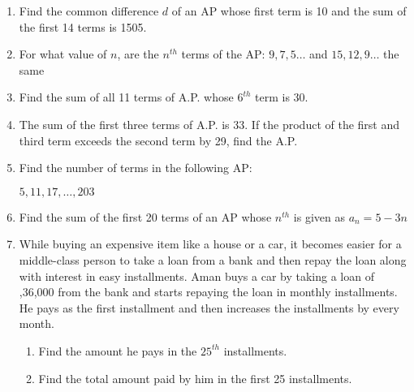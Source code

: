 \documentclass{article}
\begin{document}
\begin{enumerate}
    \item Find the common difference $d$ of an AP whose first term is 10 and the sum of the first 14 terms is 1505.
    \item For what value of $n$, are the $n^{th}$ terms of the AP: $9,7,5\dots$ and $15,12,9\dots$ the same

    \item Find the sum of all 11 terms of A.P. whose $6^{th}$ term is 30.
    \item The sum of the first three terms of A.P. is 33. If the product of the first and third term exceeds the second term by 29, find the A.P.

    \item Find the number of terms in the following AP:
    
    $5,11,17,\dots,203$

    \item Find the sum of the first 20 terms of an AP whose $n^{th}$ is given as $a_n= 5 - 3n$
   

    \item While buying an expensive item like a house or a car, it becomes easier for a middle-class person to take a loan from a bank and then repay the loan along with interest in easy installments. Aman buys a car by taking a loan of ,36,000 from the bank and starts repaying the loan in monthly installments. He pays  as the first installment and then increases the installments by  every month.     
    \begin{enumerate}
    
 \item Find the amount he pays in the $25^{th}$ installments.
    \item Find the total amount paid by him in the first 25 installments.

\end{enumerate}

\end{enumerate}
\end{document}
